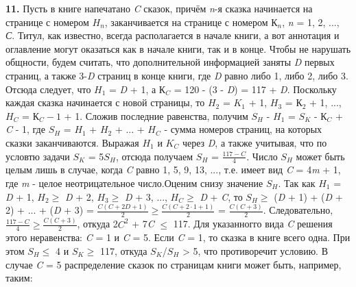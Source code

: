 \documentclass[10pt, a4paper, twoside]{article}
\begin{document}
\begin{multicols*}{2}
\textbf{11. }Пусть в книге напечатано \textit{C} сказок, причём \textit{n}-я сказка начинается на странице с номером $\textit{H}_\textit{n}$, заканчивается на странице с номером $\textit{К}_\textit{n}$, \textit{n} = 1, 2, ..., \textit{С}. Титул, как известно, всегда располагается в начале книги, а вот аннотация и оглавление могут оказаться как в начале книги, так и в конце. Чтобы не нарушать общности, будем считать, что дополнительной информацией заняты \textit{D} первых страниц, а также 3-\textit{D} страниц в конце книги, где \textit{D} равно либо 1, либо 2, либо 3. Отсюда следует, что $\textit{H}_1$ = \textit{D} + 1, а $\textit{К}_\textit{C}$ = 120 - (3 - \textit{D}) = 117 + \textit{D}. Поскольку каждая сказка начинается с новой страницы, то $\textit{H}_2$ = $\textit{K}_1$ + 1, $\textit{H}_3$ = $\textit{К}_2$ + 1, ..., $\textit{H}_\textit{C}$ = $\textit{К}_\textit{C}-1$ + 1. Сложив последние равенства, получим $\textit{S}_\textit{H}$ - $\textit{H}_1$ = $\textit{S}_\textit{K}$ - $\textit{К}_\textit{C}$ + \textit{C} - 1, где $\textit{S}_\textit{H}$ = $\textit{H}_1$ + $\textit{H}_2$ + ... + $\textit{H}_\textit{C}$ - сумма номеров страниц, на которых сказки заканчиваются. Выражая $\textit{H}_1$ и $\textit{K}_\textit{C}$ через \textit{D}, а также учитывая, что по условтю задачи $\textit{S}_\textit{K}$ = 5$\textit{S}_\textit{H}$, отсюда получаем $\textit{S}_\textit{H}$ = $\frac{117-\textit{C}}{4}$. Число $\textit{S}_\textit{H}$ может быть целым лишь в случае, когда \textit{C} равно 1, 5, 9, 13, ..., т.е. имеет вид \textit{C} = 4\textit{m} + 1, где \textit{m} - целое неотрицательное число.\newline Оценим снизу значение $\textit{S}_\textit{H}$. Так как $\textit{H}_1$ = \textit{D} + 1, $\textit{H}_2 \ge$ \textit{D} + 2, $\textit{H}_3 \ge$ \textit{D} + 3, ..., $\textit{H}_\textit{C} \ge$ \textit{D} + \textit{C}, то\newline
$\textit{S}_\textit{H} \ge$ (\textit{D} + 1) + (\textit{D} + 2) + ... + (\textit{D} + 3) = $\frac{\textit{C}(\textit{C} + 2\textit{D} + 1)}{2} \ge \frac{\textit{C}(\textit{C} + 2\cdot1 + 1)}{2}$ = $\frac{\textit{C}(\textit{C} + 3)}{2}$.\newline
Следовательно, $\frac{117-\textit{C}}{4} \ge \frac{\textit{C}(\textit{C} + 3)}{2}$, откуда 2$\textit{C}^2$ + 7\textit{C} $\le$ 117.\newline
Для указанногго вида \textit{C} решения этого неравенства: \textit{C} = 1 и \textit{C} = 5.
Если \textit{C} = 1, то сказка в книге всего одна. При этом $\textit{S}_\textit{H} \le$ 4 и  $\textit{S}_\textit{K} \ge$ 117, откуда $\textit{S}_\textit{K}$/$\textit{S}_\textit{H}$ > 5, что противоречит условию. В случае \textit{C} = 5 распределение сказок по страницам книги может быть, например, таким:\newline

\end{multicols*}
\end{document}
